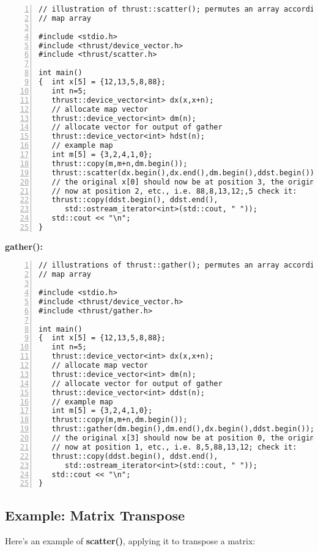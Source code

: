 \begin{lstlisting}[numbers=left]
// illustration of thrust::scatter(); permutes an array according to a
// map array

#include <stdio.h>
#include <thrust/device_vector.h>
#include <thrust/scatter.h>

int main()
{  int x[5] = {12,13,5,8,88};
   int n=5;
   thrust::device_vector<int> dx(x,x+n);
   // allocate map vector
   thrust::device_vector<int> dm(n);
   // allocate vector for output of gather
   thrust::device_vector<int> hdst(n);
   // example map
   int m[5] = {3,2,4,1,0};
   thrust::copy(m,m+n,dm.begin());
   thrust::scatter(dx.begin(),dx.end(),dm.begin(),ddst.begin());
   // the original x[0] should now be at position 3, the original x[1]
   // now at position 2, etc., i.e. 88,8,13,12;,5 check it:
   thrust::copy(ddst.begin(), ddst.end(), 
      std::ostream_iterator<int>(std::cout, " "));
   std::cout << "\n";
}
\end{lstlisting}

{\bf gather():}

\begin{lstlisting}[numbers=left]
// illustrations of thrust::gather(); permutes an array according to a
// map array

#include <stdio.h>
#include <thrust/device_vector.h>
#include <thrust/gather.h>

int main()
{  int x[5] = {12,13,5,8,88};
   int n=5;
   thrust::device_vector<int> dx(x,x+n);
   // allocate map vector
   thrust::device_vector<int> dm(n);
   // allocate vector for output of gather
   thrust::device_vector<int> ddst(n);
   // example map
   int m[5] = {3,2,4,1,0};
   thrust::copy(m,m+n,dm.begin());
   thrust::gather(dm.begin(),dm.end(),dx.begin(),ddst.begin());
   // the original x[3] should now be at position 0, the original x[2]
   // now at position 1, etc., i.e. 8,5,88,13,12; check it:
   thrust::copy(ddst.begin(), ddst.end(), 
      std::ostream_iterator<int>(std::cout, " "));
   std::cout << "\n";
}
\end{lstlisting}

\subsection{Example:  Matrix Transpose}
\label{matxpose}

Here's an example of {\bf scatter()}, applying it to transpose a matrix:

